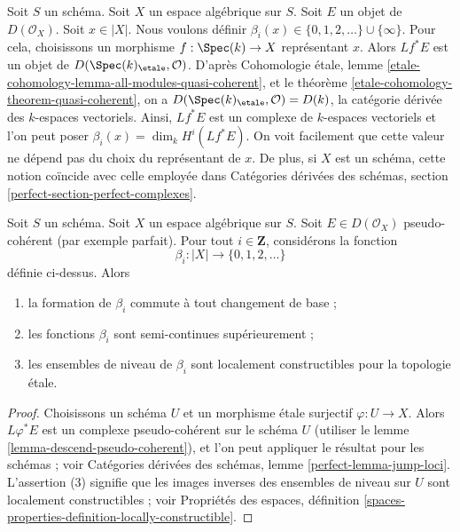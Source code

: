 \medskip\noindent
Soit $S$ un sch\'ema. Soit $X$ un espace alg\'ebrique sur $S$.
Soit $E$ un objet de $D(\mathcal{O}_X)$.
Soit $x\in|X|$. Nous voulons d\'efinir
$\beta_i(x)\in\{0,1,2,\ldots\}\cup\{\infty\}$.
Pour cela, choisissons un morphisme $f:\Spec(k)\to X$ représentant $x$.
Alors $Lf^*E$ est un objet de
$D(\Spec(k)_\etale,\mathcal{O})$.
D'apr\`es Cohomologie \'etale, lemme
\ref{etale-cohomology-lemma-all-modules-quasi-coherent}, et le th\'eor\`eme
\ref{etale-cohomology-theorem-quasi-coherent}, on a
$D(\Spec(k)_\etale,\mathcal{O})=D(k)$, la cat\'egorie d\'eriv\'ee des
$k$-espaces vectoriels. Ainsi, $Lf^*E$ est un complexe de $k$-espaces
vectoriels et l'on peut poser
$\beta_i(x)=\dim_k H^i(Lf^*E)$. On voit facilement que cette valeur ne d\'epend
pas du choix du repr\'esentant de $x$. De plus, si $X$ est un sch\'ema, cette
notion co\"incide avec celle employ\'ee dans Cat\'egories d\'eriv\'ees des
sch\'emas, section \ref{perfect-section-perfect-complexes}.

\begin{lemma}
\label{lemma-jump-loci}
Soit $S$ un sch\'ema. Soit $X$ un espace alg\'ebrique sur $S$.
Soit $E\in D(\mathcal{O}_X)$ pseudo-coh\'erent (par exemple parfait).
Pour tout $i\in\mathbf{Z}$, consid\'erons la fonction
$$
\beta_i : |X| \longrightarrow \{0, 1, 2, \ldots\}
$$
d\'efinie ci-dessus. Alors
\begin{enumerate}
\item la formation de $\beta_i$ commute \`a tout changement de base ;
\item les fonctions $\beta_i$ sont semi-continues sup\'erieurement ;
\item les ensembles de niveau de $\beta_i$ sont localement constructibles
pour la topologie \'etale.
\end{enumerate}
\end{lemma}

\begin{proof}
Choisissons un sch\'ema $U$ et un morphisme \'etale surjectif
$\varphi:U\to X$. Alors $L\varphi^*E$ est un complexe pseudo-coh\'erent sur le
sch\'ema $U$ (utiliser le lemme \ref{lemma-descend-pseudo-coherent}), et l'on
peut appliquer le r\'esultat pour les sch\'emas ; voir Cat\'egories d\'eriv\'ees
des sch\'emas, lemme \ref{perfect-lemma-jump-loci}. L'assertion (3) signifie
que les images inverses des ensembles de niveau sur $U$ sont localement
constructibles ; voir Propri\'et\'es des espaces, d\'efinition
\ref{spaces-properties-definition-locally-constructible}.
\end{proof}

